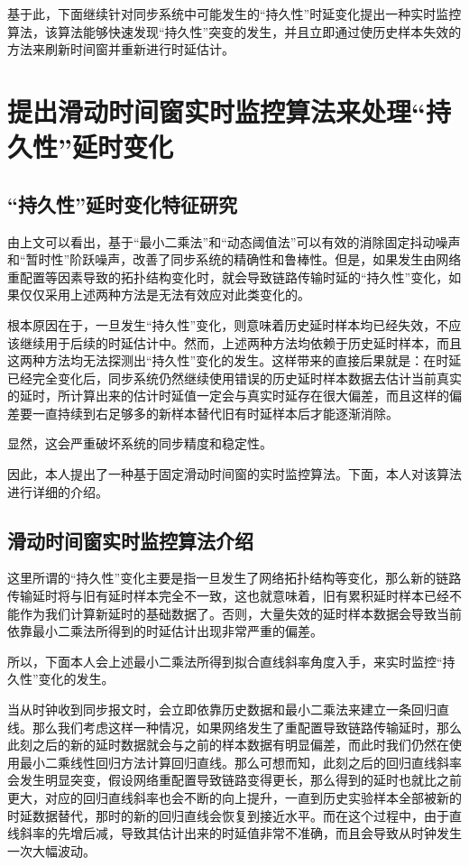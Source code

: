 基于此，下面继续针对同步系统中可能发生的“持久性”时延变化提出一种实时监控算法，该算法能够快速发现“持久性”突变的发生，并且立即通过使历史样本失效的方法来刷新时间窗并重新进行时延估计。

\section{提出滑动时间窗实时监控算法来处理“持久性”延时变化}
\subsection{“持久性”延时变化特征研究}
由上文可以看出，基于“最小二乘法”和“动态阈值法”可以有效的消除固定抖动噪声和“暂时性”阶跃噪声，改善了同步系统的精确性和鲁棒性。但是，如果发生由网络重配置等因素导致的拓扑结构变化时，就会导致链路传输时延的“持久性”变化，如果仅仅采用上述两种方法是无法有效应对此类变化的。

根本原因在于，一旦发生“持久性”变化，则意味着历史延时样本均已经失效，不应该继续用于后续的时延估计中。然而，上述两种方法均依赖于历史延时样本，而且这两种方法均无法探测出“持久性”变化的发生。这样带来的直接后果就是：在时延已经完全变化后，同步系统仍然继续使用错误的历史延时样本数据去估计当前真实的延时，所计算出来的估计时延值一定会与真实时延存在很大偏差，而且这样的偏差要一直持续到右足够多的新样本替代旧有时延样本后才能逐渐消除。

显然，这会严重破坏系统的同步精度和稳定性。

因此，本人提出了一种基于固定滑动时间窗的实时监控算法。下面，本人对该算法进行详细的介绍。

\subsection{滑动时间窗实时监控算法介绍}
这里所谓的“持久性”变化主要是指一旦发生了网络拓扑结构等变化，那么新的链路传输延时将与旧有延时样本完全不一致，这也就意味着，旧有累积延时样本已经不能作为我们计算新延时的基础数据了。否则，大量失效的延时样本数据会导致当前依靠最小二乘法所得到的时延估计出现非常严重的偏差。

所以，下面本人会上述最小二乘法所得到拟合直线斜率角度入手，来实时监控“持久性”变化的发生。

当从时钟收到同步报文时，会立即依靠历史数据和最小二乘法来建立一条回归直线。那么我们考虑这样一种情况，如果网络发生了重配置导致链路传输延时，那么此刻之后的新的延时数据就会与之前的样本数据有明显偏差，而此时我们仍然在使用最小二乘线性回归方法计算回归直线。那么可想而知，此刻之后的回归直线斜率会发生明显突变，假设网络重配置导致链路变得更长，那么得到的延时也就比之前更大，对应的回归直线斜率也会不断的向上提升，一直到历史实验样本全部被新的时延数据替代，那时的新的回归直线会恢复到接近水平。而在这个过程中，由于直线斜率的先增后减，导致其估计出来的时延值非常不准确，而且会导致从时钟发生一次大幅波动。

